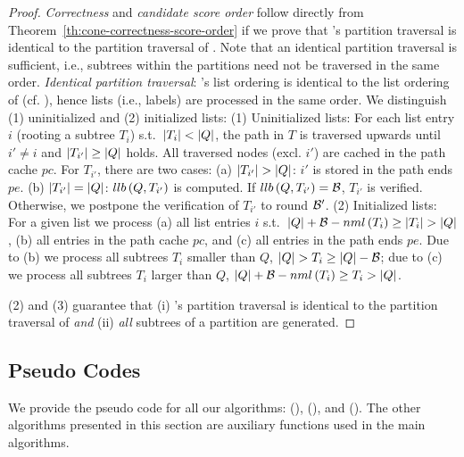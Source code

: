 \theoremslimconecorrectnessscoreorder*

\begin{proof}
\emph{Correctness} and \emph{candidate score order} follow directly from Theorem~\ref{th:cone-correctness-score-order} if we prove that \shincone{}'s partition traversal is identical to the partition traversal of \cone{}. Note that an identical partition traversal is sufficient, i.e., subtrees within the partitions need not be traversed in the same order. \emph{Identical partition traversal}:
%
\shincone{}'s list ordering is identical to the list ordering of \cone{} (cf. ), hence lists (i.e., labels) are processed in the same order. We distinguish (1) uninitialized and (2) initialized lists:
%
(1) Uninitialized lists: For each list entry $i$ (rooting a subtree $T_i$) s.t.\ $\left| T_i \right| < \left| Q \right|$, the path in $T$ is traversed upwards until $i' \neq i$ and $\left| T_{i'} \right| \geq \left| Q \right|$ holds. All traversed nodes (excl. $i'$) are cached in the path cache $pc$.
%
For $T_{i'}$, there are two cases: (a) $\left| T_{i'} \right| > \left| Q \right|$: $i'$ is stored in the path ends $pe$. (b) $\left| T_{i'} \right| = \left| Q \right|$: $llb \left( Q, T_{i'} \right)$ is computed. If $llb \left( Q, T_{i'} \right) = \mathcal{B}$, $T_{i'}$ is verified.
%
Otherwise, we postpone the verification of $T_{i'}$ to round $\mathcal{B}'$.
%
(2) Initialized lists: For a given list we process (a) all list entries $i$ s.t.\ $\left| Q \right| + \mathcal{B} - nml \left( T_i \right) \geq \left| T_i \right| > \left| Q \right|$, (b) all entries in the path cache $pc$, and (c) all entries in the path ends $pe$.
%
Due to (b) we process all subtrees $T_i$ smaller than $Q$, $\left| Q \right| > T_i \geq \left| Q \right| - \mathcal{B}$; due to (c) we process all subtrees $T_i$ larger than $Q$, $\left| Q \right| + \mathcal{B} - nml \left( T_i \right) \geq T_i > \left| Q \right|$.

(2) and (3) guarantee that (i) \shincone{}'s partition traversal is identical to the partition traversal of \cone{} \emph{and} (ii) \emph{all} subtrees of a partition are generated.
\end{proof}

\subsection{Pseudo Codes}
\label{sec:pseudo-codes}

We provide the pseudo code for all our algorithms: \lowerboundmerge{} (), \cone{} (), and \shincone{} (). The other algorithms presented in this section are auxiliary functions used in the main algorithms.

